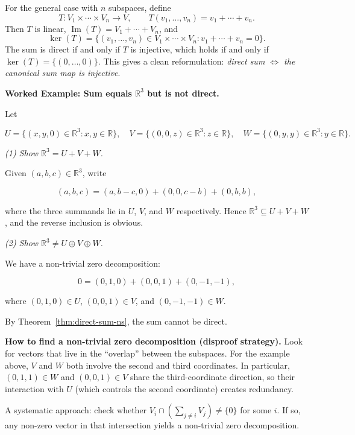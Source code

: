 \begin{extension}[title={Extension (Tutorial 2, Question 1, Method 2: Sum map for $n$ subspaces)}]
For the general case with $n$ subspaces, define
\[
T:V_1\times\cdots\times V_n\to V,\qquad T(v_1,\dots,v_n)=v_1+\cdots+v_n.
\]
Then $T$ is linear, $\operatorname{Im}(T)=V_1+\cdots+V_n$, and
\[
\ker(T)=\{(v_1,\dots,v_n)\in V_1\times\cdots\times V_n : v_1+\cdots+v_n=0\}.
\]
The sum is direct if and only if $T$ is injective, which holds if and only if $\ker(T)=\{(0,\dots,0)\}$.
This gives a clean reformulation: \emph{direct sum $\iff$ the canonical sum map is injective}.
\end{extension}

\begin{examplebox}

\textbf{Worked Example: Sum equals $\mathbb{R}^3$ but is not direct.}

Let

\[
U=\{(x,y,0)\in\mathbb{R}^3:x,y\in\mathbb{R}\},\quad
V=\{(0,0,z)\in\mathbb{R}^3:z\in\mathbb{R}\},\quad
W=\{(0,y,y)\in\mathbb{R}^3:y\in\mathbb{R}\}.
\]

\emph{(1) Show $\mathbb{R}^3=U+V+W$.}

Given $(a,b,c)\in\mathbb{R}^3$, write

\[
(a,b,c)=(a,b-c,0)+(0,0,c-b)+(0,b,b),
\]

where the three summands lie in $U$, $V$, and $W$ respectively. Hence $\mathbb{R}^3\subseteq U+V+W$, and the reverse inclusion is obvious.

\medskip

\emph{(2) Show $\mathbb{R}^3\neq U\oplus V\oplus W$.}

We have a non-trivial zero decomposition:

\[
0=(0,1,0)+(0,0,1)+(0,-1,-1),
\]

where $(0,1,0)\in U$, $(0,0,1)\in V$, and $(0,-1,-1)\in W$.

By Theorem~\ref{thm:direct-sum-ns}, the sum cannot be direct.

\end{examplebox}

\begin{policynote}
\textbf{How to find a non-trivial zero decomposition (disproof strategy).}
Look for vectors that live in the ``overlap'' between the subspaces.  For the example above, $V$ and $W$ both involve the second and third coordinates.  In particular, $(0,1,1)\in W$ and $(0,0,1)\in V$ share the third-coordinate direction, so their interaction with $U$ (which controls the second coordinate) creates redundancy.

A systematic approach: check whether $V_i\cap(\sum_{j\neq i}V_j)\neq\{0\}$ for some $i$.  If so, any non-zero vector in that intersection yields a non-trivial zero decomposition.
\end{policynote}

